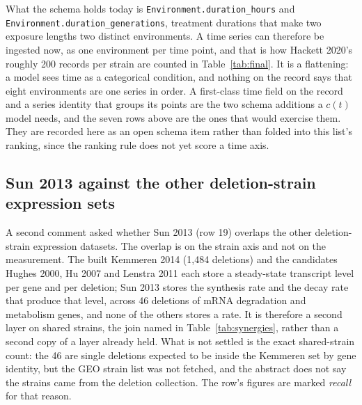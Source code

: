 What the schema holds today is \texttt{Environment.duration\_hours} and
\texttt{Environment.duration\_generations}, treatment durations that make two exposure
lengths two distinct environments. A time series can therefore be ingested now, as one
environment per time point, and that is how Hackett 2020's roughly 200 records per strain
are counted in Table~\ref{tab:final}. It is a flattening: a model sees time as a
categorical condition, and nothing on the record says that eight environments are one
series in order. A first-class time field on the record and a series identity that groups
its points are the two schema additions a $c(t)$ model needs, and the seven rows above are
the ones that would exercise them. They are recorded here as an open schema item rather
than folded into this list's ranking, since the ranking rule does not yet score a time
axis.

\subsection{Sun 2013 against the other deletion-strain expression sets}\label{sec:sun}

A second comment asked whether Sun 2013 (row 19) overlaps the other deletion-strain
expression datasets. The overlap is on the strain axis and not on the measurement. The
built Kemmeren 2014 (1,484 deletions) and the candidates Hughes 2000, Hu 2007 and Lenstra
2011 each store a steady-state transcript level per gene and per deletion; Sun 2013 stores
the synthesis rate and the decay rate that produce that level, across 46 deletions of mRNA
degradation and metabolism genes, and none of the others stores a rate. It is therefore a
second layer on shared strains, the join named in Table~\ref{tab:synergies}, rather than a
second copy of a layer already held. What is not settled is the exact shared-strain count:
the 46 are single deletions expected to be inside the Kemmeren set by gene identity, but
the GEO strain list was not fetched, and the abstract does not say the strains came from
the deletion collection. The row's figures are marked \emph{recall} for that reason.
